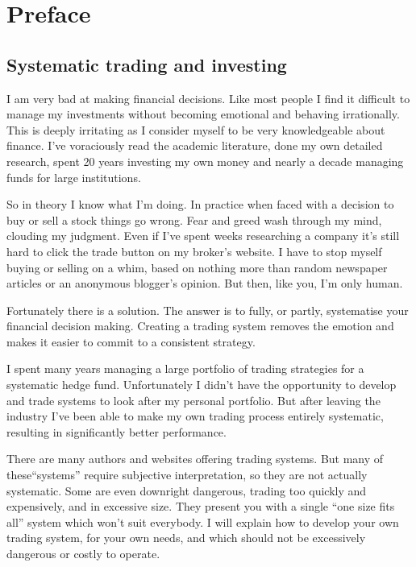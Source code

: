 \chapter*{Preface}  {} 

\section*{Systematic trading and investing}  {}

I am very bad at making financial decisions. Like most people I find it difficult to manage my investments without becoming emotional and behaving irrationally. This is deeply irritating as I consider myself to be very knowledgeable about finance. I've voraciously read the academic literature, done my own detailed research, spent 20 years investing my own money and nearly a decade managing funds for large institutions.

So in theory I know what I'm doing. In practice when faced with a decision to buy or sell a stock things go wrong. Fear and greed wash through my mind, clouding my judgment. Even if I've spent weeks researching a company it's still hard to click the trade button on my broker's website. I have to stop myself buying or selling on a whim, based on nothing more than random newspaper articles or an anonymous blogger's opinion. But then, like you, I'm only human.

Fortunately there is a solution. The answer is to fully, or partly, systematise your financial decision making. Creating a trading system removes the emotion and makes it easier to commit to a consistent strategy.

I spent many years managing a large portfolio of trading strategies for a systematic hedge fund. Unfortunately I didn't have the opportunity to develop and trade systems to look after my personal portfolio. But after leaving the industry I've been able to make my own trading process entirely systematic, resulting in significantly better performance.

There are many authors and websites offering trading systems. But many of these``systems'' require subjective interpretation, so they are not actually systematic. Some are even downright dangerous, trading too quickly and expensively, and in excessive size. They present you with a single ``one size fits all'' system which won't suit everybody. I will explain how to develop your own trading system, for your own needs, and which should not be excessively dangerous or costly to operate.

